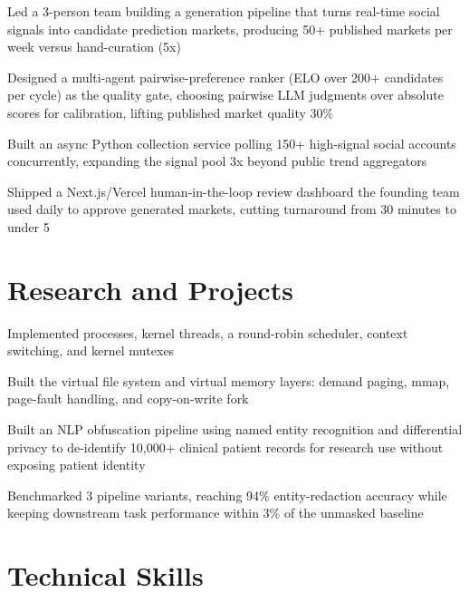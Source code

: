\documentclass[10pt]{article}
\begin{document}
\begin{bullets}
  \item Led a 3-person team building a generation pipeline that turns real-time social signals into candidate prediction markets, producing 50+ published markets per week versus hand-curation (5x)
  \item Designed a multi-agent pairwise-preference ranker (ELO over 200+ candidates per cycle) as the quality gate, choosing pairwise LLM judgments over absolute scores for calibration, lifting published market quality 30\%
  \item Built an async Python collection service polling 150+ high-signal social accounts concurrently, expanding the signal pool 3x beyond public trend aggregators
  \item Shipped a Next.js/Vercel human-in-the-loop review dashboard the founding team used daily to approve generated markets, cutting turnaround from 30 minutes to under 5
\end{bullets}

\section{Research and Projects}
\begin{bullets}
  \item Implemented processes, kernel threads, a round-robin scheduler, context switching, and kernel mutexes
  \item Built the virtual file system and virtual memory layers: demand paging, mmap, page-fault handling, and copy-on-write fork
\end{bullets}

\begin{bullets}
  \item Built an NLP obfuscation pipeline using named entity recognition and differential privacy to de-identify 10,000+ clinical patient records for research use without exposing patient identity
  \item Benchmarked 3 pipeline variants, reaching 94\% entity-redaction accuracy while keeping downstream task performance within 3\% of the unmasked baseline
\end{bullets}

\section{Technical Skills}
\end{document}
